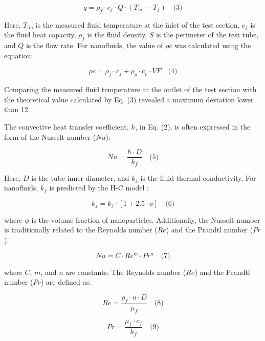 \documentclass{article}
\begin{document}
\begin{equation}
q = \rho_f \cdot c_f \cdot Q \cdot (T_{\text{fin}} - T_f) \quad \text{(3)}
\end{equation}

Here, $T_{\text{fin}}$ is the measured fluid temperature at the inlet of the test section, $c_f$ is the fluid heat capacity, $\rho_f$ is the fluid density, $S$ is the perimeter of the test tube, and $Q$ is the flow rate. For nanofluids, the value of $\rho c$ was calculated using the equation:

\begin{equation}
\rho c = \rho_f \cdot c_f + \rho_p \cdot c_p \cdot VF \quad \text{(4)}
\end{equation}

Comparing the measured fluid temperature at the outlet of the test section with the theoretical value calculated by Eq. (3) revealed a maximum deviation lower than 12%

The convective heat transfer coefficient, $h$, in Eq. (2), is often expressed in the form of the Nusselt number ($Nu$):

\begin{equation}
Nu = \frac{h \cdot D}{k_f} \quad \text{(5)}
\end{equation}

Here, $D$ is the tube inner diameter, and $k_f$ is the fluid thermal conductivity. For nanofluids, $k_f$ is predicted by the H-C model \cite{ref8}:

\begin{equation}
k_f = k_f \cdot [1 + 2.5 \cdot \phi] \quad \text{(6)}
\end{equation}

where $\phi$ is the volume fraction of nanoparticles. Additionally, the Nusselt number is traditionally related to the Reynolds number ($Re$) and the Prandtl number ($Pr$):

\begin{equation}
Nu = C \cdot Re^m \cdot Pr^n \quad \text{(7)}
\end{equation}

where $C$, $m$, and $n$ are constants. The Reynolds number ($Re$) and the Prandtl number ($Pr$) are defined as:

\begin{equation}
Re = \frac{\rho_f \cdot u \cdot D}{\mu_f} \quad \text{(8)}
\end{equation}

\begin{equation}
Pr = \frac{\mu_f \cdot c_f}{k_f} \quad \text{(9)}
\end{equation}
\end{document}
